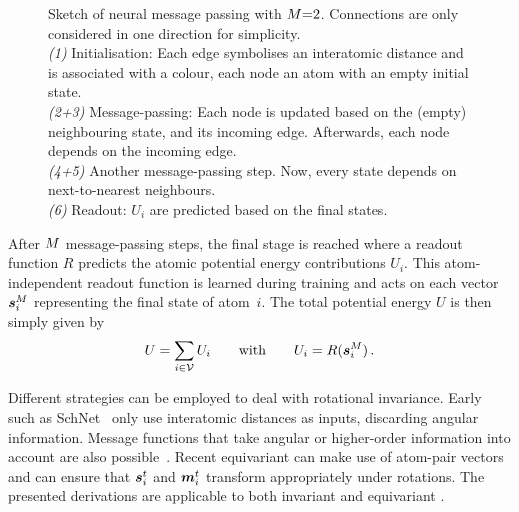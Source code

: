 \begin{figure*}
    \caption{Sketch of neural message passing with $M{=}2$. Connections are only considered in one direction for simplicity. 
    \\
    \textit{(1)} Initialisation: Each edge symbolises an interatomic distance and is associated with a colour, each node an atom with an empty initial state.\\
    \textit{(2+3)} Message-passing: Each node is updated based on the (empty) neighbouring state, and its incoming edge. Afterwards, each node depends on the incoming edge.\\
    \textit{(4+5)} Another message-passing step. Now, every state depends on next-to-nearest neighbours.\\
    \textit{(6)} Readout: $U_i$ are predicted based on the final states.
    }
    \label{fig:glp-mpnn_sketch}
\end{figure*}

After $M$ message-passing steps, the final stage is reached where a readout function $R$ predicts the atomic potential energy contributions $U_i$. This atom-independent readout function is learned during training and acts on each vector $\boldsymbol{s}_{i}^{M}$ representing the final state of atom~$i$. The total potential energy $U$ is then simply given by
\begin{align}
  U = \sum_{i \in \vertices} U_i
  \qquad \text{with} \qquad
  U_i = R(\state{i}{\interactions}) \, .
  \label{eq:mpnn_ui} 
\end{align}

Different strategies can be employed to deal with rotational invariance. Early \mpnns{} such as SchNet~\cite{sktm2017q,sstm2018q} only use interatomic distances as inputs, discarding angular information. 
Message functions that take angular or higher-order information into account are also possible~\cite{kgg2020q,bkoc2022q,bbkc2022a}.
Recent equivariant \mpnns{} \cite{tskr2018q,ahk2019q,bmsk2022q,ucsm2021q,sug2021a,fum2022q} can make use of atom-pair vectors and can ensure that $\boldsymbol{s}_{i}^{t}$ and $\boldsymbol{m}_{i}^{t}$ transform appropriately under rotations. 
The presented derivations are applicable to both invariant and equivariant \mpnns{}.

